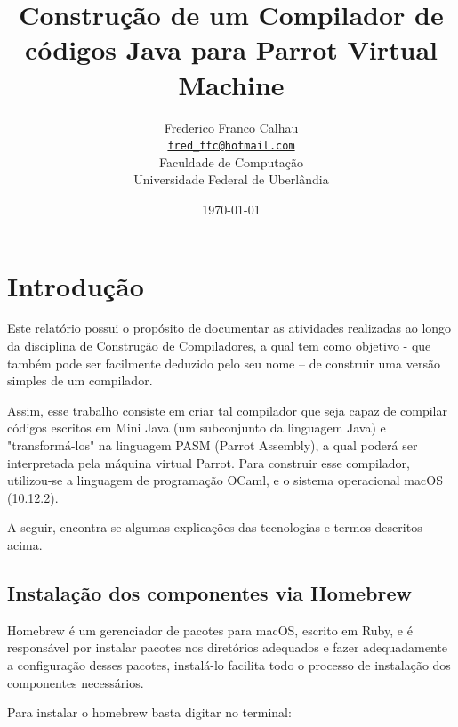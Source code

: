 \documentclass[12pt,a4paper,twoside]{report}
\title{Construção de um Compilador de códigos Java para Parrot Virtual Machine}
\date{}
\author{Frederico Franco Calhau \\
\texttt{\small \url{fred_ffc@hotmail.com}}
\vspace{1cm} \\
Faculdade de Computação \\
Universidade Federal de Uberlândia
}
\date{\today}
\begin{document}
  \maketitle
\listoffigures
\listoftables
\lstlistoflistings

\tableofcontents


\fancyhead[RE,LO]{\thesection}

\setlength{\parskip}{0.15in} %

\chapter{Introdução}

Este relatório possui o propósito de documentar as atividades realizadas ao longo da disciplina de Construção de Compiladores, a qual tem como objetivo - que também pode ser facilmente deduzido pelo seu nome – de construir uma versão simples de um compilador.

Assim, esse trabalho consiste em criar tal compilador que seja capaz de compilar códigos escritos em Mini Java (um subconjunto da linguagem Java) e "transformá-los" na linguagem PASM (Parrot Assembly), a qual poderá ser interpretada pela máquina virtual Parrot. Para construir esse compilador, utilizou-se a linguagem de programação OCaml, e o sistema operacional macOS (10.12.2).

A seguir, encontra-se algumas explicações das tecnologias e termos descritos acima.

\section{Instalação dos componentes via Homebrew}

Homebrew é um gerenciador de pacotes para macOS, escrito em Ruby, e é responsável por instalar pacotes nos diretórios adequados e fazer adequadamente a configuração desses pacotes, instalá-lo facilita todo o processo de instalação dos componentes necessários.

Para instalar o homebrew basta digitar no terminal:
\end{document}
